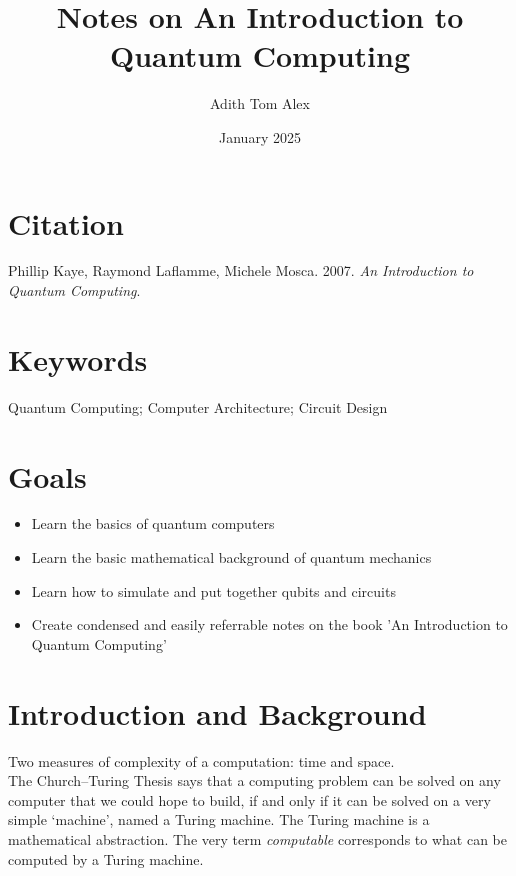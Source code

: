 \documentclass[12pt]{article}
\title{Notes on An Introduction to Quantum Computing}
\author{Adith Tom Alex}
\date{January 2025}
\begin{document}
\maketitle

\section{Citation}
Phillip Kaye, Raymond Laflamme, Michele Mosca. 2007. \textit{An Introduction to Quantum Computing}.

\section{Keywords}
Quantum Computing; Computer Architecture; Circuit Design

\section{Goals}
\begin{itemize}
    \item Learn the basics of quantum computers
    \item Learn the basic mathematical background of quantum mechanics
    \item Learn how to simulate and put together qubits and circuits
    \item Create condensed and easily referrable notes on the book 'An Introduction to Quantum Computing'
\end{itemize}

\clearpage %


\setcounter{section}{0}  %



\section{Introduction and Background}

Two measures of complexity of a computation: time and space.\\

The Church–Turing Thesis says that a computing problem can be solved on any computer that we could hope to build, if and only if it can be solved on a very simple ‘machine’, named a Turing machine. The Turing machine is a mathematical abstraction.
The very term \textit{computable} corresponds to what can be computed by
a Turing machine.
\end{document}
